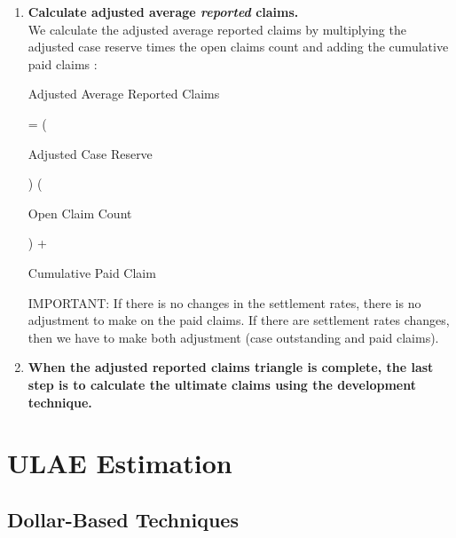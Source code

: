 \documentclass[11pt, english]{memoir}
\numberwithin{definition}{section}
\begin{document}
\begin{enumerate}
		\item \textbf{Calculate adjusted average \emph{reported} claims.}\\
		We calculate the adjusted average reported claims by  multiplying the adjusted case reserve times the open claims count and adding the cumulative paid claims  :
		\begin{tcolorbox}
		\begin{minipage}{0.22\linewidth}\centering
			Adjusted Average Reported Claims
		\end{minipage} = 
		\left(\begin{minipage}{0.18\linewidth}\centering
			Adjusted Case Reserve
		\end{minipage}\right)
		\left(\begin{minipage}{0.15\linewidth}\centering
			Open Claim Count
		\end{minipage}\right) + 
		\begin{minipage}{0.18\linewidth}\centering
			Cumulative Paid Claim
		\end{minipage}
		\end{tcolorbox}
		
		
		IMPORTANT: If there is no changes in the settlement rates, there is no adjustment to make on the paid claims. If there are settlement rates changes, then we have to make both adjustment (case outstanding and paid claims). \\
	
	
	
		\item \textbf{When the adjusted reported claims triangle is complete, the last step is to calculate the ultimate claims using the development technique.} 
	\end{enumerate}
	
	
	

\chapter{ULAE Estimation}


\section{Dollar-Based Techniques}
\end{document}
